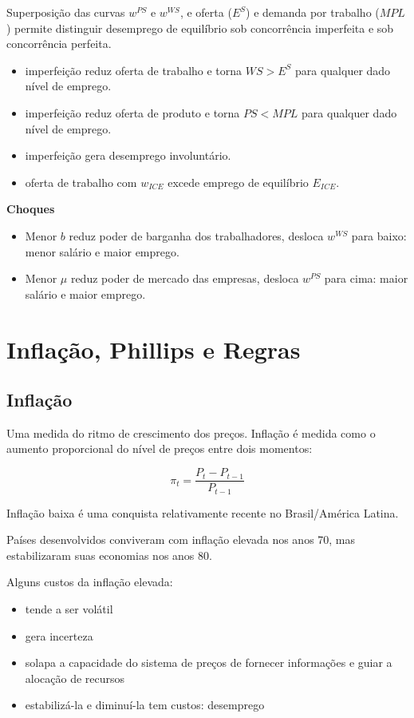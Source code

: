 \documentclass[a4paper,12pt]{article}[abntex2]
\begin{document}
Superposição das curvas \( w^{PS} \) e \( w^{WS} \), e oferta (\( E^S \)) e demanda por trabalho (\( MPL \)) permite distinguir desemprego de equilíbrio sob concorrência imperfeita e sob concorrência perfeita.

\begin{itemize}
    \item imperfeição reduz oferta de trabalho e torna \( WS > E^S \) para qualquer dado nível de emprego.
    \item imperfeição reduz oferta de produto e torna \( PS < MPL \) para qualquer dado nível de emprego.
    \item imperfeição gera desemprego involuntário.
    \item oferta de trabalho com \( w_{ICE} \) excede emprego de equilíbrio \( E_{ICE} \).
\end{itemize}

\textbf{Choques}

\begin{itemize}
    \item Menor \( b \) reduz poder de barganha dos trabalhadores, desloca \( w^{WS} \) para baixo: menor salário e maior emprego.
    \item Menor \( \mu \) reduz poder de mercado das empresas, desloca \( w^{PS} \) para cima: maior salário e maior emprego.
\end{itemize}

\newpage
\section{\textbf{Inflação, Phillips e Regras}}
\subsection{\textbf{Inflação}}
Uma medida do ritmo de crescimento dos preços. Inflação é medida como o aumento proporcional do nível de preços entre dois momentos:

\[
\pi_t = \frac{P_t - P_{t-1}}{P_{t-1}}
\]

Inflação baixa é uma conquista relativamente recente no Brasil/América Latina.

Países desenvolvidos conviveram com inflação elevada nos anos 70, mas estabilizaram suas economias nos anos 80.

Alguns custos da inflação elevada:
\begin{itemize}
    \item tende a ser volátil
    \item gera incerteza
    \item solapa a capacidade do sistema de preços de fornecer informações e guiar a alocação de recursos
    \item estabilizá-la e diminuí-la tem custos: desemprego
\end{itemize}
\end{document}
